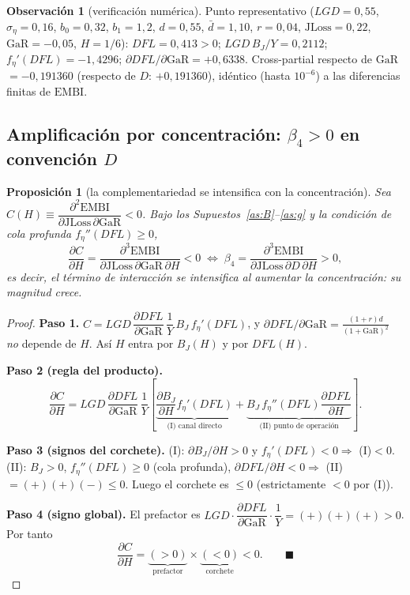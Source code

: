\documentclass[11pt]{article}
\theoremstyle{plain}
\newtheorem{proposition}{Proposición}
\theoremstyle{definition}
\newtheorem{remark}{Observación}
\newcommand{\JLoss}{\mathrm{JLoss}}
\newcommand{\EMBI}{\mathrm{EMBI}}
\newcommand{\GaR}{\mathrm{GaR}}
\newcommand{\1}{\mathbf{1}}
\begin{document}
\begin{remark}[verificación numérica]
Punto representativo ($LGD=0{,}55$, $\sigma_\eta=0{,}16$, $b_0=0{,}32$, $b_1=1{,}2$, $d=0{,}55$, $\bar d=1{,}10$, $r=0{,}04$, $\JLoss=0{,}22$, $\GaR=-0{,}05$, $H=1/6$): $DFL=0{,}413>0$; $LGD\,B_J/Y=0{,}2112$; $f_\eta'(DFL)=-1{,}4296$; $\partial DFL/\partial\GaR=+0{,}6338$. Cross-partial respecto de $\GaR$ $=-0{,}191360$ (respecto de $D$: $+0{,}191360$), idéntico (hasta $10^{-6}$) a las diferencias finitas de $\EMBI$.
\end{remark}

\subsection{Amplificación por concentración: $\beta_4>0$ en convención $D$}

\begin{proposition}[la complementariedad se intensifica con la concentración]\label{prop:amp}
Sea $C(H)\equiv\dfrac{\partial^2 \EMBI}{\partial \JLoss\,\partial \GaR}<0$. Bajo los Supuestos~\ref{as:B}--\ref{as:g} y la condición de cola profunda $f_\eta''(DFL)\ge0$,
\[
\frac{\partial C}{\partial H}=\frac{\partial^3 \EMBI}{\partial \JLoss\,\partial \GaR\,\partial H}<0
\;\Longleftrightarrow\;
\beta_4=\frac{\partial^3 \EMBI}{\partial \JLoss\,\partial D\,\partial H}>0,
\]
es decir, el término de interacción se intensifica al aumentar la concentración: su magnitud crece.
\end{proposition}
\begin{proof}
\textbf{Paso 1.} $C=LGD\,\dfrac{\partial DFL}{\partial \GaR}\,\dfrac1Y\,B_J\,f_\eta'(DFL)$, y $\partial DFL/\partial\GaR=\frac{(1+r)d}{(1+\GaR)^2}$ \emph{no} depende de $H$. Así $H$ entra por $B_J(H)$ y por $DFL(H)$.

\textbf{Paso 2 (regla del producto).}
\[
\frac{\partial C}{\partial H}=LGD\,\frac{\partial DFL}{\partial \GaR}\,\frac1Y\left[\underbrace{\frac{\partial B_J}{\partial H}f_\eta'(DFL)}_{\text{(I) canal directo}}+\underbrace{B_J\,f_\eta''(DFL)\frac{\partial DFL}{\partial H}}_{\text{(II) punto de operación}}\right].
\]

\textbf{Paso 3 (signos del corchete).}
(I): $\partial B_J/\partial H>0$ y $f_\eta'(DFL)<0\Rightarrow$ (I)$<0$.\quad
(II): $B_J>0$, $f_\eta''(DFL)\ge0$ (cola profunda), $\partial DFL/\partial H<0\Rightarrow$ (II)$=(+)(+)(-)\le0$.
Luego el corchete es $\le0$ (estrictamente $<0$ por (I)).

\textbf{Paso 4 (signo global).} El prefactor es $LGD\cdot\dfrac{\partial DFL}{\partial\GaR}\cdot\dfrac1Y=(+)(+)(+)>0$. Por tanto
\[
\frac{\partial C}{\partial H}=\underbrace{(>0)}_{\text{prefactor}}\times\underbrace{(<0)}_{\text{corchete}}<0. \qquad\blacksquare
\]
\end{proof}
\end{document}
